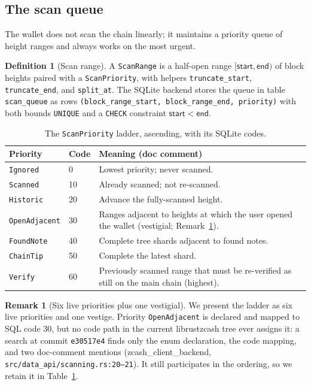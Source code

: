 \documentclass[11pt,a4paper]{article}
\theoremstyle{definition}
\newtheorem{definition}[theorem]{Definition}
\newtheorem{remark}[theorem]{Remark}
\begin{document}
\subsection{The scan queue}\label{sec:sync-queue}

The wallet does not scan the chain linearly; it maintains a priority queue
of height ranges and always works on the most urgent.

\begin{definition}[Scan range]\label{def:sync-scanrange}
A \texttt{ScanRange} is a half-open range $[\mathsf{start}, \mathsf{end})$
of block heights paired with a \texttt{ScanPriority}, with helpers
\texttt{truncate\_start}, \texttt{truncate\_end}, and \texttt{split\_at}.
The
SQLite backend stores the queue in table \texttt{scan\_queue} as rows
\texttt{(block\_range\_start, block\_range\_end, priority)} with both
bounds \texttt{UNIQUE} and a \texttt{CHECK} constraint
$\mathsf{start} < \mathsf{end}$.
\end{definition}

\begin{table}[htbp]
\centering
\begin{tabular}{@{}llp{8.2cm}@{}}
\toprule
Priority & Code & Meaning (doc comment) \\
\midrule
\texttt{Ignored}      & 0  & Lowest priority; never scanned. \\
\texttt{Scanned}      & 10 & Already scanned; not re-scanned. \\
\texttt{Historic}     & 20 & Advance the fully-scanned height. \\
\texttt{OpenAdjacent} & 30 & Ranges adjacent to heights at which the user
                             opened the wallet (vestigial;
                             Remark~\ref{rem:sync-openadjacent}). \\
\texttt{FoundNote}    & 40 & Complete tree shards adjacent to found notes. \\
\texttt{ChainTip}     & 50 & Complete the latest shard. \\
\texttt{Verify}       & 60 & Previously scanned range that must be
                             re-verified as still on the main chain
                             (highest). \\
\bottomrule
\end{tabular}
\caption{The \texttt{ScanPriority} ladder, ascending, with its SQLite codes.}
\label{tab:sync-priorities}
\end{table}

\begin{remark}[Six live priorities plus one vestigial]
\label{rem:sync-openadjacent}
We present the ladder as six live priorities and one vestige. Priority
\texttt{OpenAdjacent} is declared and mapped to SQL code $30$, but no code
path in the current \textsf{librustzcash} tree ever assigns it: a search at
commit \texttt{e30517e4} finds only the enum declaration, the code mapping,
and two doc-comment mentions
(\textsf{zcash\_client\_backend}, \texttt{src/data\_api/scanning.rs:20--21}). It
still participates in the ordering, so we retain it in
Table~\ref{tab:sync-priorities}.
\end{remark}
\end{document}
